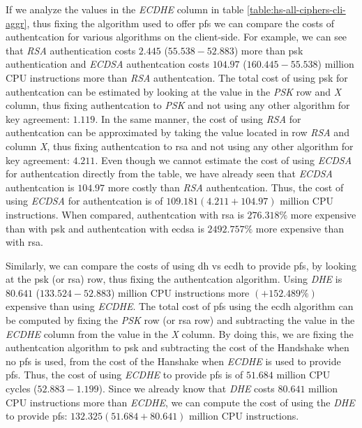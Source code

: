 \documentclass{llncs}
\begin{document}
If we analyze the values in the \textit{ECDHE} column in table \ref{table:hs-all-ciphers-cli-aggr}, thus fixing the
algorithm used to offer \gls{pfs} we can compare the costs of authentcation for various algorithms on the client-side.
For example, we can see that \textit{RSA} authentication costs $2.445$  ($55.538 - 52.883$) 
more than \gls{psk} authentication and \textit{ECDSA} authentcation costs $104.97$ ($160.445 - 55.538$) 
million CPU instructions more than
\textit{RSA} authentcation. The total cost of using \gls{psk} for authentcation can be estimated by looking at the
value in the \textit{PSK} row and \textit{X} column, thus fixing authentcation to \textit{PSK} and not using any other
algorithm for key agreement: $1.119$. In the same manner, the cost of using \textit{RSA} for authentcation can
be approximated by taking the value located in row \textit{RSA} and column \textit{X}, thus fixing authentcation
to \gls{rsa} and not using any other algorithm for key agreement: $4.211$. Even though we cannot estimate the cost
of using \textit{ECDSA} for authentcation directly from the table, we have already seen that \textit{ECDSA} authentcation
is $104.97$ more costly than \textit{RSA} authentcation. Thus, the cost of using \textit{ECDSA} for authentcation
is of $109.181 (4.211+104.97)$ million CPU instructions. When compared, authentcation with \gls{rsa} is
$276.318\%$ more expensive than with \gls{psk} and authentcation with \gls{ecdsa} is $2492.757\%$ more expensive than with \gls{rsa}.

Similarly, we can compare the costs of using \gls{dh} vs \gls{ecdh} to provide \gls{pfs}, by
looking at the \gls{psk} (or \gls{rsa}) row, thus fixing the authentcation algorithm. Using \textit{DHE} is 
$80.641$ ($133.524 - 52.883$) million CPU instructions more $(+152.489\%)$ expensive than using \textit{ECDHE}. The total cost of \gls{pfs}
using the \gls{ecdh} algorithm can be computed by fixing the \textit{PSK} row (or \gls{rsa} row) 
and subtracting the value in the \textit{ECDHE} column from the value in the \textit{X} column. By doing this, we are 
fixing the authentcation algorithm to \gls{psk} and subtracting the cost of the Handshake when no \gls{pfs} is used, 
from the cost of the Hanshake when \textit{ECDHE} is used to provide \gls{pfs}. Thus, the cost of using \textit{ECDHE}
to provide \gls{pfs} is of $51.684$ million CPU cycles ($52.883-1.199$). Since we already know that \textit{DHE} costs
$80.641$ million CPU instructions more than \textit{ECDHE}, we can compute the cost of using the \textit{DHE} to
provide \gls{pfs}: $132.325 (51.684+80.641)$ million CPU instructions.
\end{document}
